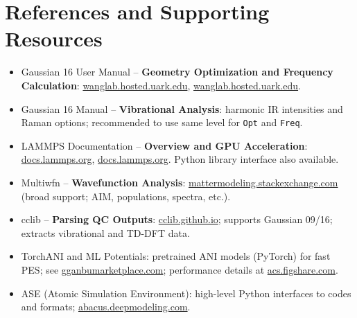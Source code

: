 \documentclass[11pt]{article}
\begin{document}
\section{References and Supporting Resources}
\begin{itemize}
  \item Gaussian 16 User Manual -- \textbf{Geometry Optimization and Frequency Calculation}: \href{https://wanglab.hosted.uark.edu/g98help/00000437.htm\#:\~:text=frequencies\%20for\%20a\%20correlated\%20method,route\%20section\%20for\%20a\%20job}{wanglab.hosted.uark.edu}, \href{https://wanglab.hosted.uark.edu/g98help/00000437.htm\#:\~:text=This\%20calculation\%20type\%20keyword\%20computes,required\%2C\%20polarizabilities\%20must\%20be\%20explicitly}{wanglab.hosted.uark.edu}.
  \item Gaussian 16 Manual -- \textbf{Vibrational Analysis}: harmonic IR intensities and Raman options; recommended to use same level for \texttt{Opt} and \texttt{Freq}.
  \item LAMMPS Documentation -- \textbf{Overview and GPU Acceleration}: \href{https://docs.lammps.org/Intro_overview.html\#:\~:text=LAMMPS\%20is\%20a\%20classical\%20molecular,few\%20particles\%20up\%20to\%20billions}{docs.lammps.org}, \href{https://docs.lammps.org/Intro_overview.html\#:\~:text=clusters\%20and\%20supercomputers,threading\%2C\%20vectorization\%2C\%20and\%20GPU\%20acceleration}{docs.lammps.org}. Python library interface also available.
  \item Multiwfn -- \textbf{Wavefunction Analysis}: \href{https://mattermodeling.stackexchange.com/questions/3493/quantifying-electronic-overlap\#:\~:text=,MRCC\%2C\%20deMon2k\%2C\%20Firefly\%2C\%20CFour\%2C\%20Turbomole}{mattermodeling.stackexchange.com} (broad support; AIM, populations, spectra, etc.).
  \item cclib -- \textbf{Parsing QC Outputs}: \href{https://cclib.github.io/\#:\~:text=cclib\%20is\%20an\%20open\%20source,contained\%20in\%20output\%20files\%2C\%20specifically}{cclib.github.io}; supports Gaussian 09/16; extracts vibrational and TD-DFT data.
  \item TorchANI and ML Potentials: pretrained ANI models (PyTorch) for fast PES; see \href{https://gganbumarketplace.com/machine-learning/torchani-ani-family-neural-network-potentials-molecular-simulations/\#:\~:text=TorchANI\%20and\%20the\%20ANI\%20Family\%3A,of\%20pretrained\%20models\%20or}{gganbumarketplace.com}; performance details at \href{https://acs.figshare.com/articles/journal_contribution/TorchANI_2_0_An_Extensible_High-Performance_Library_for_the_Design_Training_and_Use_of_NN-IPs/30388327\#:\~:text=TorchANI\%202.0\%3A\%20An\%20Extensible\%2C\%20High,inference\%2C\%20and\%20the\%20library}{acs.figshare.com}.
  \item ASE (Atomic Simulation Environment): high-level Python interfaces to codes and formats; \href{https://abacus.deepmodeling.com}{abacus.deepmodeling.com}.
\end{itemize}
\end{document}
